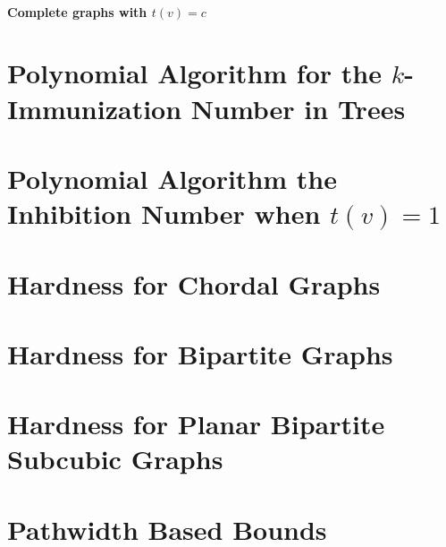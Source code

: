 \documentclass[10pt,aspectratio=169,english]{beamer}
\begin{document}
\subsection{Complete graphs with $t(v)=c$}

\part{Polynomial Algorithm for the $k$-Immunization Number in Trees}

\begin{frame}
	\partpage
\end{frame}

\part{Polynomial Algorithm the Inhibition Number when $t(v) = 1$}

\begin{frame}
	\partpage
\end{frame}

\part{Hardness for Chordal Graphs}

\begin{frame}
	\partpage
\end{frame}

\part{Hardness for Bipartite Graphs}

\begin{frame}
	\partpage
\end{frame}

\part{Hardness for Planar Bipartite Subcubic Graphs}

\begin{frame}
	\partpage
\end{frame}

\part{Pathwidth Based Bounds}

\begin{frame}
	\partpage
\end{frame}
\end{document}
